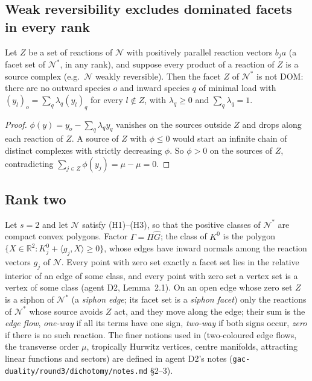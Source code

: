 \documentclass[11pt,a4paper]{report}
\newcommand{\Net}{\mathcal{N}}
\newcommand{\Nd}{\mathcal{N}^{*}}
\begin{document}
\subsection{Weak reversibility excludes dominated facets in every rank}

\begin{theorem}\label{thm:W}
Let \(Z\) be a set of reactions of \(\Net\) with positively parallel reaction vectors \(b_ja\) (a facet set of \(\Nd\), in any
rank), and suppose every product of a reaction of \(Z\) is a source complex (e.g.\ \(\Net\) weakly reversible). Then the facet
\(Z\) of \(\Nd\) is not DOM: there are no outward species \(o\) and inward species \(q\) of minimal load with
\((y_l)_o=\sum_q\lambda_q(y_l)_q\) for every \(l\notin Z\), with \(\lambda_q\ge0\) and
\(\sum_q\lambda_q=1\).
\end{theorem}
\begin{proof}
\(\phi(y)=y_o-\sum_q\lambda_qy_q\) vanishes on the sources outside \(Z\) and drops along each reaction of \(Z\). A source of
\(Z\) with \(\phi\le0\) would start an infinite chain of distinct complexes with strictly decreasing \(\phi\). So \(\phi>0\) on
the sources of \(Z\), contradicting \(\sum_{j\in Z}\phi(y_j)=\mu-\mu=0\).
\end{proof}

\subsection{Rank two}\label{sec:rank2}

Let \(s=2\) and let \(\Net\) satisfy (H1)--(H3), so that the positive classes of \(\Nd\) are compact convex polygons.
Factor \(\Gamma=\Pi\hat G\); the class of \(K^0\) is the polygon \(\{X\in\mathbb{R}^2:K^0_j+\langle g_j,X\rangle\ge0\}\),
whose edges have inward normals among the reaction vectors \(g_j\) of \(\Net\). Every point with zero set exactly a facet
set lies in the relative interior of an edge of some class, and every point with zero set a vertex set is a vertex of
some class (agent D2, Lemma~2.1). On an open edge whose zero set \(Z\) is a siphon of \(\Nd\) (a \emph{siphon edge};
its facet set is a \emph{siphon facet}) only the reactions of \(\Nd\) whose source avoids \(Z\) act, and they move
along the edge; their sum is the \emph{edge flow}, \emph{one-way} if all its terms have one sign, \emph{two-way} if both
signs occur, \emph{zero} if there is no such reaction. The finer notions used in 
(two-coloured edge flows, the transverse order \(\mu\), tropically Hurwitz vertices, centre manifolds, attracting
linear functions and sectors) are defined in agent D2's notes (\texttt{gac-duality/round3/dichotomy/notes.md} §2--3).
\end{document}
